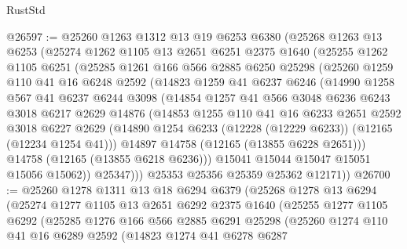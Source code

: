 \begin{lexlean}{RustStd}
\begin{coremodule}
@26597 := @25260
    @1263
    @1312
    @13
    @19
    @6253
    @6380
    (@25268
      @1263
      @13
      @6253
      (@25274
        @1262
        @1105
        @13
        @2651
        @6251
        @2375
        @1640
        (@25255
          @1262
          @1105
          @6251
          (@25285
            @1261
            @166
            @566
            @2885
            @6250
            @25298
            (@25260
              @1259
              @110
              @41
              @16
              @6248
              @2592
              (@14823
                @1259
                @41
                @6237
                @6246
                (@14990
                  @1258
                  @567
                  @41
                  @6237
                  @6244
                  @3098
                  (@14854
                    @1257
                    @41
                    @566
                    @3048
                    @6236
                    @6243
                    @3018
                    @6217
                    @2629
                    @14876
                    (@14853
                      @1255
                      @110
                      @41
                      @16
                      @6233
                      @2651
                      @2592
                      @3018
                      @6227
                      @2629
                      (@14890 @1254 @6233 (@12228 (@12229 @6233)) (@12165 (@12234 @1254 @41)))
                      @14897
                      @14758
                      (@12165 (@13855 @6228 @2651)))
                    @14758
                    (@12165 (@13855 @6218 @6236)))
                  @15041
                  @15044
                  @15047
                  @15051
                  @15056
                  @15062))
              @25347)))
        @25353
        @25356
        @25359
        @25362
        @12171))
@26700 := @25260
    @1278
    @1311
    @13
    @18
    @6294
    @6379
    (@25268
      @1278
      @13
      @6294
      (@25274
        @1277
        @1105
        @13
        @2651
        @6292
        @2375
        @1640
        (@25255
          @1277
          @1105
          @6292
          (@25285
            @1276
            @166
            @566
            @2885
            @6291
            @25298
            (@25260
              @1274
              @110
              @41
              @16
              @6289
              @2592
              (@14823
                @1274
                @41
                @6278
                @6287

\end{coremodule}
\end{lexlean}
